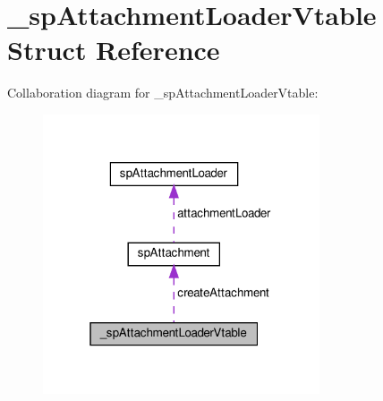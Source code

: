 \hypertarget{struct__spAttachmentLoaderVtable}{}\section{\+\_\+sp\+Attachment\+Loader\+Vtable Struct Reference}
\label{struct__spAttachmentLoaderVtable}


Collaboration diagram for \+\_\+sp\+Attachment\+Loader\+Vtable\+:
\nopagebreak
\begin{figure}[H]
\begin{center}
\leavevmode
\includegraphics[width=232pt]{struct__spAttachmentLoaderVtable__coll__graph}
\end{center}
\end{figure}
